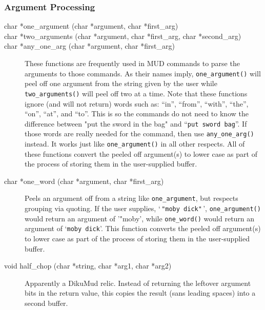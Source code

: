 \documentclass[11pt]{article}
\begin{document}
\subsubsection{Argument Processing}
\begin{description}
\item[char *one\_argument (char *argument, char *first\_arg)]
\item[char *two\_arguments (char *argument, char *first\_arg, char *second\_arg)]
\item[char *any\_one\_arg (char *argument, char *first\_arg)]
These functions are frequently used in MUD commands to parse the arguments to those commands.  As their names imply, \texttt{one\_argument()} will peel off one argument from the string given by the user while \texttt{two\_arguments()} will peel off two at a time.  Note that these
functions ignore (and will not return) words such as: ``in'', ``from'', ``with'', ``the'', ``on'', ``at'', and ``to''.  This is so the commands do not need to know the difference between "put the sword in the bag" and ``\texttt{put sword bag}''.  If those words are really needed for the command, then use \texttt{any\_one\_arg()} instead.  It works just like \texttt{one\_argument()} in all other respects.  All of these functions convert the peeled off argument(s) to lower case as part of the process of storing them in the user-supplied buffer.
\item[char *one\_word (char *argument, char *first\_arg)]
Peels an argument off from a string like \texttt{one\_argument}, but respects grouping via quoting.  If the user supplies, `\,\texttt{"moby dick"}\,', \texttt{one\_argument()} would return an argument of '"moby', while \texttt{one\_word()} would return an argument of `\texttt{moby dick}'.  This function converts the peeled off argument(s) to lower case as part of the process of storing them in the user-supplied buffer.
\item[void half\_chop (char *string, char *arg1, char *arg2)]
Apparently a DikuMud relic.  Instead of returning the leftover argument bits in the return value, this copies the result (sans leading spaces) into a second buffer.
\end{description}
\end{document}
